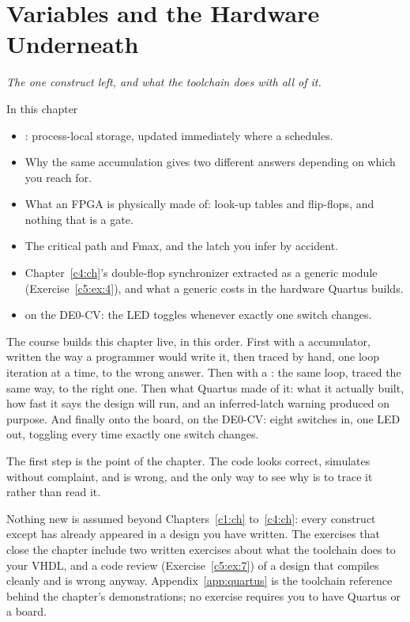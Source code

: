 
\chapter{Variables and the Hardware Underneath}
\label{c5:ch}

{\large\itshape The one construct left, and what the toolchain does with all of it.\par}

\begin{chapterbox}{In this chapter}
\begin{itemize}
  \item {}: process-local storage, updated immediately where a 
    schedules.
  \item Why the same accumulation gives two different answers depending on which you reach for.
  \item What an FPGA is physically made of: look-up tables and flip-flops, and nothing that is a
    gate.
  \item The critical path and Fmax, and the latch you infer by accident.
  \item Chapter~\ref{c4:ch}'s double-flop synchronizer extracted as a generic module
    (Exercise~\ref{c5:ex:4}), and what a generic costs in the hardware Quartus builds.
  \item {} on the DE0-CV: the LED toggles whenever exactly one switch changes.
\end{itemize}
\end{chapterbox}

The course builds this chapter live, in this order. First  with a 
accumulator, written the way a programmer would write it, then traced by hand, one loop iteration
at a time, to the wrong answer. Then  with a : the same loop, traced
the same way, to the right one. Then what Quartus made of it: what it actually built, how fast it
says the design will run, and an inferred-latch warning produced on purpose. And finally onto the
board,  on the DE0-CV: eight switches in, one LED out, toggling every time exactly
one switch changes.

The first step is the point of the chapter. The code looks correct, simulates without complaint,
and is wrong, and the only way to see why is to trace it rather than read it.

Nothing new is assumed beyond Chapters~\ref{c1:ch} to~\ref{c4:ch}: every construct except
 has already appeared in a design you have written. The exercises that close the
chapter include two written exercises about what the toolchain does to your VHDL, and a code review
(Exercise~\ref{c5:ex:7}) of a design that compiles cleanly and is wrong anyway.
Appendix~\ref{app:quartus} is the toolchain reference behind the chapter's demonstrations; no
exercise requires you to have Quartus or a board.




